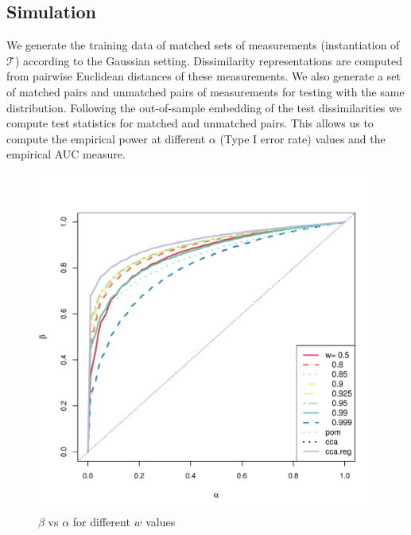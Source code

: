 \documentclass[12pt]{article} %
\begin{document}
\subsection{Simulation\label{subsec:sim}}

We generate the training data of matched sets of measurements (instantiation of $\mathcal{T}$) according to  the Gaussian setting. Dissimilarity representations are computed from pairwise Euclidean distances of these measurements. We also generate a set of matched pairs and unmatched pairs of measurements for testing with the same distribution. Following the out-of-sample embedding of the test dissimilarities 
we compute test statistics  for matched and unmatched pairs. This allows us to compute the empirical power  at different $\alpha$ (Type I error rate) values and the empirical AUC measure.


\begin{figure}[h]
     \centering
\includegraphics[scale=0.35]{MVN-FC-Tradeoff-OOS-c0.pdf}
\caption{$\beta$ vs $\alpha$  for different $w$ values }
\label{fig:MVN-c0-power-alpha}
\end{figure}
\end{document}

